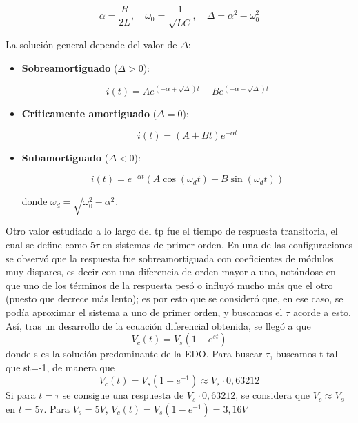 \documentclass{article}
\begin{document}
\begin{equation}
\alpha = \frac{R}{2L}, \quad \omega_0 = \frac{1}{\sqrt{LC}}, \quad \Delta = \alpha^2 - \omega_0^2
\end{equation}

La solución general depende del valor de \( \Delta \):

\begin{itemize}
  \item \textbf{Sobreamortiguado} (\( \Delta > 0 \)):

  \begin{equation}
  i(t) = A e^{(-\alpha + \sqrt{\Delta})t} + B e^{(-\alpha - \sqrt{\Delta})t}
  \end{equation}

  \item \textbf{Críticamente amortiguado} (\( \Delta = 0 \)):

  \begin{equation}
  i(t) = (A + Bt)e^{-\alpha t}
  \end{equation}

  \item \textbf{Subamortiguado} (\( \Delta < 0 \)):

  \begin{equation}
  i(t) = e^{-\alpha t} \left( A \cos(\omega_d t) + B \sin(\omega_d t) \right)
  \end{equation}

  donde \( \omega_d = \sqrt{\omega_0^2 - \alpha^2} \).
\end{itemize}

\par Otro valor estudiado a lo largo del tp fue el tiempo de respuesta transitoria, el cual se define como 5$\tau$ en sistemas de
primer orden. En una de las configuraciones se observó que la respuesta fue sobreamortiguada con coeficientes de módulos muy dispares,
es decir con una diferencia de orden mayor a uno, notándose en que uno de los términos de la respuesta pesó o influyó mucho más 
que el otro (puesto que decrece más lento); es por esto que se consideró que, en ese caso, se podía aproximar el sistema a uno de 
primer orden, y buscamos el $\tau$ acorde a esto. Así, tras un desarrollo de la ecuación diferencial obtenida, se llegó a que
\begin{equation*}
    V_c(t) = V_s (1-e^{st})
\end{equation*}
donde s es la solución predominante de la EDO. Para buscar $\tau$, buscamos t tal que st=-1, de manera que
\begin{equation*}
    V_c(t) = V_s (1-e^{-1}) \approx V_s \cdot 0,63212
\end{equation*}
Si para $t=\tau$ se consigue una respuesta de $ V_s \cdot 0,63212$, se considera que $V_c \approx V_s$ en $t=5\tau$. Para $V_s=5 V$, $V_c(t) = V_s (1-e^{-1}) = 3,16 V$ \par
\end{document}
